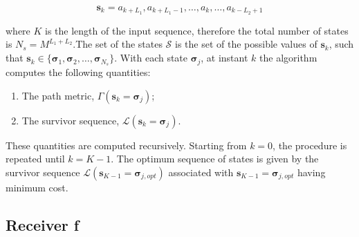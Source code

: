 \documentclass[a4paper, 12pt]{report}
\begin{document}
\begin{equation}
\textbf{s}_k = a_{k+L_1},a_{k+L_1-1},\dots,a_{k},\dots,a_{k-L_2+1} 
\end{equation}

where $K$ is the length of the input sequence, therefore the total number of states is $N_s = M^{L_1+L_2}$.The set of the states $\mathcal{S}$ is the set of the possible values of $\textbf{s}_k$, such that $\mathbf{s}_k \in \{ \mathbf{\sigma}_1,\mathbf{\sigma}_2,\dots,\mathbf{\sigma}_{N_s} \}$. With each state $\mathbf{\sigma}_j$, at instant $k$ the algorithm computes the following quantities:

\begin{enumerate}
	\item The path metric, $\Gamma(\mathbf{s}_k=\mathbf{\sigma}_j)$;
	\item The survivor sequence, $\mathcal{L}(\mathbf{s}_k=\mathbf{\sigma}_j)$.
\end{enumerate}

These quantities are computed recursively. Starting from $k=0$, the procedure is repeated until $k=K-1$. The optimum sequence of states is given by the survivor sequence $\mathcal{L}(\mathbf{s}_{K-1}=\mathbf{\sigma}_{j,opt})$ associated with $\mathbf{s}_{K-1}=\mathbf{\sigma}_{j,opt}$ having minimum cost.

\clearpage
\subsection*{Receiver f}
\end{document}
